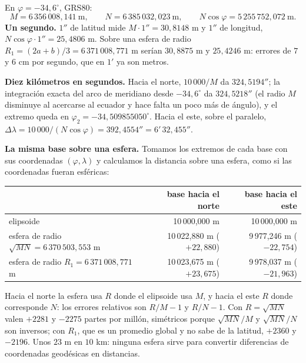 \begin{ejemplo}\label{ej:elip-ba}
En \(\varphi=-34{,}6^\circ\), GRS80:
\[
  M=6\,356\,008{,}141\ \text{m},\qquad N=6\,385\,032{,}023\ \text{m},\qquad
  N\cos\varphi=5\,255\,752{,}072\ \text{m}.
\]
\textbf{Un segundo.} \(1''\) de latitud mide \(M\cdot1''=30{,}8148\) m y \(1''\) de longitud,
\(N\cos\varphi\cdot1''=25{,}4806\) m. Sobre una esfera de radio \(R_1=(2a+b)/3=6\,371\,008{,}771\)
m serían \(30{,}8875\) m y \(25{,}4246\) m: errores de \(7\) y \(6\) cm por segundo, que en
\(1'\) ya son metros.

\textbf{Diez kilómetros en segundos.} Hacia el norte, \(10\,000/M\) da \(324{,}5194''\); la
integración exacta del arco de meridiano desde \(-34{,}6^\circ\) da \(324{,}5218''\) (el radio
\(M\) disminuye al acercarse al ecuador y hace falta un poco más de ángulo), y el extremo queda
en \(\varphi_2=-34{,}509855050^\circ\). Hacia el este, sobre el paralelo,
\(\Delta\lambda=10\,000/(N\cos\varphi)=392{,}4554''=6'\,32{,}455''\).

\textbf{La misma base sobre una esfera.} Tomamos los extremos de cada base con sus
coordenadas \((\varphi,\lambda)\) y calculamos la distancia sobre una esfera, como si las
coordenadas fueran esféricas:

\begin{center}
\begin{tabular}{l rr}
\toprule
 & base hacia el norte & base hacia el este\\
\midrule
elipsoide & 10\,000{,}000 m & 10\,000{,}000 m\\
esfera de radio \(\sqrt{MN}=6\,370\,503{,}553\) m & 10\,022{,}880 m (\(+22{,}880\)) & 9\,977{,}246 m (\(-22{,}754\))\\
esfera de radio \(R_1=6\,371\,008{,}771\) m & 10\,023{,}675 m (\(+23{,}675\)) & 9\,978{,}037 m (\(-21{,}963\))\\
\bottomrule
\end{tabular}
\end{center}

Hacia el norte la esfera usa \(R\) donde el elipsoide usa \(M\), y hacia el este \(R\) donde
corresponde \(N\): los errores relativos son \(R/M-1\) y \(R/N-1\). Con \(R=\sqrt{MN}\) valen
\(+2281\) y \(-2275\) partes por millón, simétricos porque \(\sqrt{MN}/M\) y
\(\sqrt{MN}/N\) son inversos; con \(R_1\), que es un promedio global y no sabe de la latitud,
\(+2360\) y \(-2196\). Unos \(23\) m en \(10\) km: ninguna esfera sirve para convertir
diferencias de coordenadas geodésicas en distancias.


\end{ejemplo}
